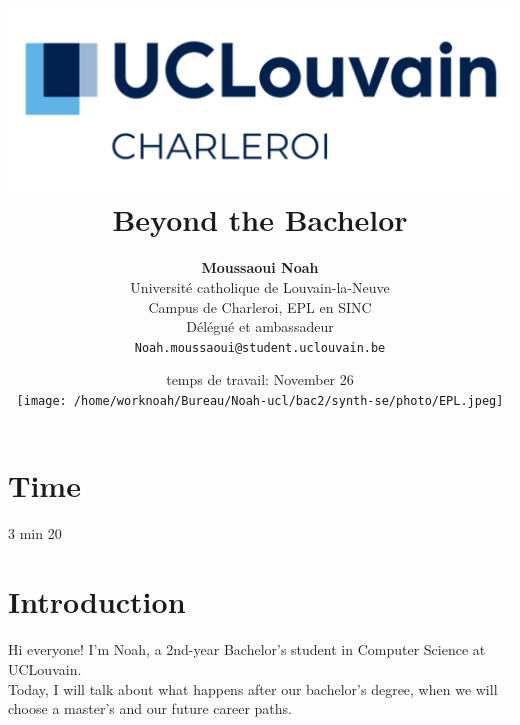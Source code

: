 \documentclass{article}
\begin{document}
\title{
    \includegraphics[width=1\textwidth]{photo/UCLouvain_Charleroi.png} \\
    \vspace{1.5cm}
    {\Huge \textbf{Beyond the Bachelor}} \\
    \vspace{1.5cm}
}

\author{
    \textbf{Moussaoui Noah} \\
    Université catholique de Louvain-la-Neuve \\
    Campus de Charleroi, EPL en SINC \\
    Délégué et ambassadeur \\
    \texttt{Noah.moussaoui@student.uclouvain.be}
}

\date{
    \vspace{1.5cm}
     temps de travail: November 26 \\
    \vspace{1.5cm}
    \texttt{[image: /home/worknoah/Bureau/Noah-ucl/bac2/synth-se/photo/EPL.jpeg]}
}

\maketitle

\section{Time}
3 min 20

\section{Introduction}

Hi everyone! I’m Noah, a 2nd-year Bachelor’s student in Computer Science at UCLouvain.\\

Today, I will talk about what happens after our bachelor’s degree,
when we will choose a master’s and our future career paths. \\
\end{document}
